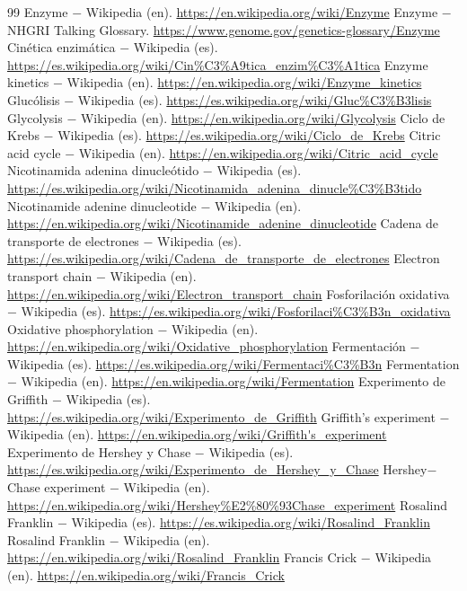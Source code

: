 \documentclass{book}
\begin{document}
\begin{thebibliography}{99}
 Enzyme \(-\) Wikipedia (en). \url{https://en.wikipedia.org/wiki/Enzyme}
 Enzyme \(-\) NHGRI Talking Glossary. \url{https://www.genome.gov/genetics-glossary/Enzyme}
 Cinética enzimática \(-\) Wikipedia (es). \url{https://es.wikipedia.org/wiki/Cin%C3%A9tica_enzim%C3%A1tica}
 Enzyme kinetics \(-\) Wikipedia (en). \url{https://en.wikipedia.org/wiki/Enzyme_kinetics}
 Glucólisis \(-\) Wikipedia (es). \url{https://es.wikipedia.org/wiki/Gluc%C3%B3lisis}
 Glycolysis \(-\) Wikipedia (en). \url{https://en.wikipedia.org/wiki/Glycolysis}
 Ciclo de Krebs \(-\) Wikipedia (es). \url{https://es.wikipedia.org/wiki/Ciclo_de_Krebs}
 Citric acid cycle \(-\) Wikipedia (en). \url{https://en.wikipedia.org/wiki/Citric_acid_cycle}
 Nicotinamida adenina dinucleótido \(-\) Wikipedia (es). \url{https://es.wikipedia.org/wiki/Nicotinamida_adenina_dinucle%C3%B3tido}
 Nicotinamide adenine dinucleotide \(-\) Wikipedia (en). \url{https://en.wikipedia.org/wiki/Nicotinamide_adenine_dinucleotide}
 Cadena de transporte de electrones \(-\) Wikipedia (es). \url{https://es.wikipedia.org/wiki/Cadena_de_transporte_de_electrones}
 Electron transport chain \(-\) Wikipedia (en). \url{https://en.wikipedia.org/wiki/Electron_transport_chain}
 Fosforilación oxidativa \(-\) Wikipedia (es). \url{https://es.wikipedia.org/wiki/Fosforilaci%C3%B3n_oxidativa}
 Oxidative phosphorylation \(-\) Wikipedia (en). \url{https://en.wikipedia.org/wiki/Oxidative_phosphorylation}
 Fermentación \(-\) Wikipedia (es). \url{https://es.wikipedia.org/wiki/Fermentaci%C3%B3n}
 Fermentation \(-\) Wikipedia (en). \url{https://en.wikipedia.org/wiki/Fermentation}
 Experimento de Griffith \(-\) Wikipedia (es). \url{https://es.wikipedia.org/wiki/Experimento_de_Griffith}
 Griffith's experiment \(-\) Wikipedia (en). \url{https://en.wikipedia.org/wiki/Griffith's_experiment}
 Experimento de Hershey y Chase \(-\) Wikipedia (es). \url{https://es.wikipedia.org/wiki/Experimento_de_Hershey_y_Chase}
 Hershey\(-\)Chase experiment \(-\) Wikipedia (en). \url{https://en.wikipedia.org/wiki/Hershey%E2%80%93Chase_experiment}
 Rosalind Franklin \(-\) Wikipedia (es). \url{https://es.wikipedia.org/wiki/Rosalind_Franklin}
 Rosalind Franklin \(-\) Wikipedia (en). \url{https://en.wikipedia.org/wiki/Rosalind_Franklin}
 Francis Crick \(-\) Wikipedia (en). \url{https://en.wikipedia.org/wiki/Francis_Crick}

\end{thebibliography}
\end{document}
